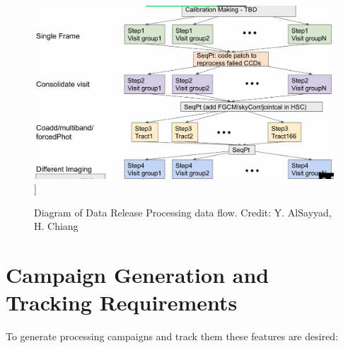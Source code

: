 \documentclass[DM,authoryear,toc]{lsstdoc}
\begin{document}
\begin{figure}
\includegraphics[width=\textwidth]{analdrp.png}]
\caption{Diagram of Data Release Processing data flow.
Credit: Y. AlSayyad, H. Chiang}
\end{figure}


\section{Campaign Generation and Tracking Requirements}

 To generate processing campaigns and track them these features are desired:
\end{document}
